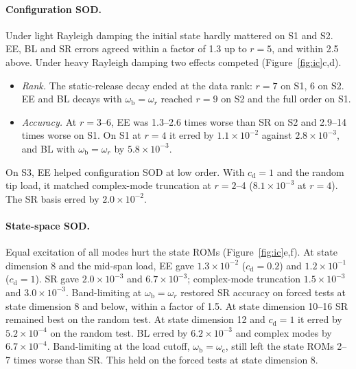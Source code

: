 \documentclass[11pt]{article}
\begin{document}
\paragraph{Configuration SOD.} Under light Rayleigh damping the initial state hardly mattered on S1 and S2. EE, BL and SR errors agreed within a factor of 1.3 up to $r=5$, and within 2.5 above.
Under heavy Rayleigh damping two effects competed (Figure~\ref{fig:ic}c,d).
\begin{itemize}
\item \emph{Rank.} The static-release decay ended at the data rank: $r=7$ on S1, 6 on S2. EE and BL decays with $\omega_{\mathrm b}=\omega_r$ reached $r=9$ on S2 and the full order on S1.
\item \emph{Accuracy.} At $r=3$--6, EE was 1.3--2.6 times worse than SR on S2 and 2.9--14 times worse on S1. On S1 at $r=4$ it erred by $1.1\times10^{-2}$ against $2.8\times10^{-3}$, and BL with $\omega_{\mathrm b}=\omega_r$ by $5.8\times10^{-3}$.
\end{itemize}
On S3, EE helped configuration SOD at low order. With $c_{\mathrm d}=1$ and the random tip load, it matched complex-mode truncation at $r=2$--4 ($8.1\times10^{-3}$ at $r=4$). The SR basis erred by $2.0\times10^{-2}$.

\paragraph{State-space SOD.} Equal excitation of all modes hurt the state ROMs (Figure~\ref{fig:ic}e,f).
At state dimension 8 and the mid-span load, EE gave $1.3\times10^{-2}$ ($c_{\mathrm d}=0.2$) and $1.2\times10^{-1}$ ($c_{\mathrm d}=1$). SR gave $2.0\times10^{-3}$ and $6.7\times10^{-3}$; complex-mode truncation $1.5\times10^{-3}$ and $3.0\times10^{-3}$.
Band-limiting at $\omega_{\mathrm b}=\omega_r$ restored SR accuracy on forced tests at state dimension 8 and below, within a factor of 1.5. At state dimension 10--16 SR remained best on the random test. At state dimension 12 and $c_{\mathrm d}=1$ it erred by $5.2\times10^{-4}$ on the random test. BL erred by $6.2\times10^{-3}$ and complex modes by $6.7\times10^{-4}$.
Band-limiting at the load cutoff, $\omega_{\mathrm b}=\omega_{\mathrm c}$, still left the state ROMs 2--7 times worse than SR. This held on the forced tests at state dimension 8.
\end{document}
